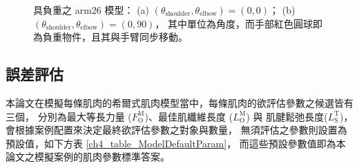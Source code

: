 \begin{figure}[!ht]
	\centering
    \caption[具負重之 arm26 模型]{具負重之 arm26 模型：
                                 (a) $(\theta_\mathrm{shoulder}, \theta_\mathrm{elbow})=(0,0)$；
                                 (b) $(\theta_\mathrm{shoulder}, \theta_\mathrm{elbow})=(0,90)$，
                                 其中單位為角度，而手部紅色圓球即為負重物件，且其與手臂同步移動。}
    \label{ch4_fig_ModelwithLoad}
\end{figure}

\subsection{誤差評估}
本論文在模擬每條肌肉的希爾式肌肉模型當中，每條肌肉的欲評估參數之候選皆有三個，
分別為最大等長力量 ($F^\mathrm{M}_\mathrm{O}$)、最佳肌纖維長度 ($L^\mathrm{M}_\mathrm{O}$) 與
肌腱鬆弛長度($L^\mathrm{T}_\mathrm{S}$)，會根據案例配置來決定最終欲評估參數之對象與數量，
無須評估之參數則設置為預設值，如下方表 \ref{ch4_table_ModelDefaultParam}，
而這些預設參數值即為本論文之模擬案例的肌肉參數標準答案。

